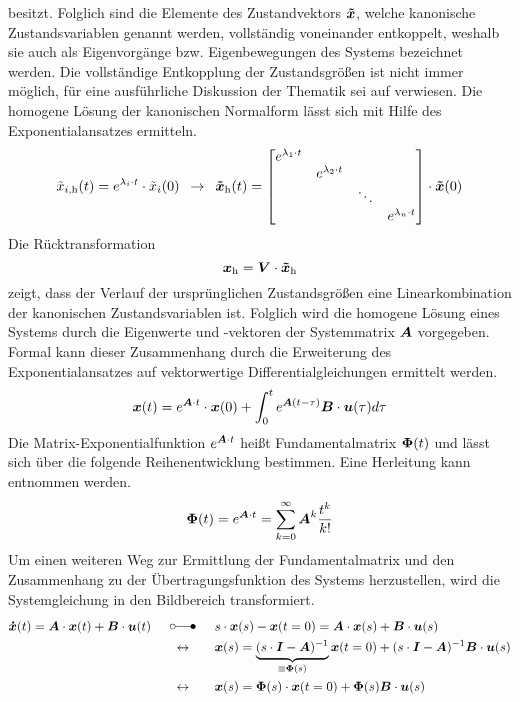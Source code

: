 besitzt. Folglich sind die Elemente des Zustandvektors $\boldsymbol{\tilde{x}}$, welche kanonische Zustandsvariablen genannt werden, vollständig voneinander entkoppelt, weshalb sie auch als  Eigenvorgänge bzw. Eigenbewegungen des Systems bezeichnet werden. Die vollständige Entkopplung der Zustandsgrößen ist nicht immer möglich, für eine ausführliche Diskussion der Thematik sei auf \cite[S. 135 ff.]{LunzeRT1} verwiesen.
Die homogene Lösung der kanonischen Normalform lässt sich mit Hilfe des Exponentialansatzes ermitteln.
\begin{equation}
\tilde{x}_{i\text{,h}}(t) = e^{\lambda_i\cdot t}\cdot \tilde{x}_i(0) \hspace{5pt}\rightarrow\hspace{5pt} \boldsymbol{\tilde{x}}_{\text{h}}(t) = \begin{bmatrix}
e^{\lambda_{\text{1}}\cdot t} &  & \\
& e^{\lambda_{\text{2}}\cdot t}  & \\
&  & \ddots & \\
&  & & e^{\lambda_n\cdot t}
\end{bmatrix}\cdot \boldsymbol{\tilde{x}}(0)
\end{equation}
Die Rücktransformation
\begin{equation}
\boldsymbol{x}_{\text{h}} = \boldsymbol{V}\cdot \boldsymbol{\tilde{x}}_{\text{h}}
\end{equation}
zeigt, dass der Verlauf der ursprünglichen Zustandsgrößen eine Linearkombination der kanonischen Zustandsvariablen ist. Folglich wird die homogene Lösung eines Systems durch die Eigenwerte und -vektoren der Systemmatrix $\boldsymbol{A}$ vorgegeben. 
Formal kann dieser Zusammenhang durch die Erweiterung des Exponentialansatzes auf vektorwertige Differentialgleichungen ermittelt werden.
\begin{equation}
\boldsymbol{x}(t) = e^{\boldsymbol{A}\cdot t}\cdot \boldsymbol{x}(0) + \int^t_0 e^{\boldsymbol{A}(t-\tau)}\boldsymbol{B}\cdot \boldsymbol{u}(\tau)d\tau
\label{eq_fMat_zeitbereich}
\end{equation}
Die Matrix-Exponentialfunktion $e^{\boldsymbol{A}\cdot t}$ heißt Fundamentalmatrix $\boldsymbol{\Phi}(t)$ und lässt sich über die folgende Reihenentwicklung bestimmen. Eine Herleitung kann \cite[S. 6 ff.]{UnbehauenRT2} entnommen werden. 
\begin{equation}
\boldsymbol{\Phi}(t) = e^{\boldsymbol{A}\cdot t} = \sum^{\infty}_{k=0} \boldsymbol{A}^k\frac{t^k}{k!}
\end{equation}
Um einen weiteren Weg zur Ermittlung der Fundamentalmatrix und den Zusammenhang zu der Übertragungsfunktion des Systems herzustellen, wird die Systemgleichung in den Bildbereich transformiert.
\begin{equation}
\begin{split}
\bs{\dot{x}}(t) = \bs{A}\cdot \bs{x}(t) + \bs{B}\cdot\bs{u}(t) \myLaplace &s\cdot\bs{x}(s) - \bs{x}(t=0) = \bs{A}\cdot \bs{x}(s) + \bs{B}\cdot \bs{u}(s)
\\
\leftrightarrow \hspace{20pt} &\bs{x}(s) = \underbrace{(s\cdot \bs{I} - \bs{A})^{-1}}_{\equiv \bs{\Phi}(s)}\bs{x}(t=0) + (s\cdot \bs{I}-\bs{A})^{-1}\bs{B}\cdot \bs{u}(s) 
\\
\leftrightarrow \hspace{20pt}&\bs{x}(s) = \bs{\Phi}(s)\cdot \bs{x}(t=0) +\bs{\Phi}(s)\bs{B}\cdot \bs{u}(s)
\end{split}
\label{eq_fMat_bildbereich}
\end{equation}
